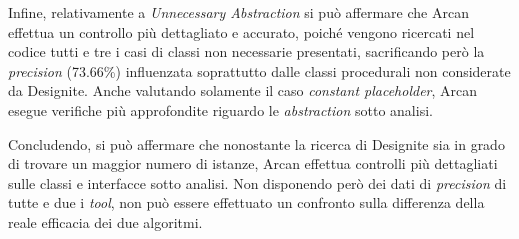 Infine, relativamente a \textit{Unnecessary Abstraction} si può affermare che Arcan effettua un controllo più dettagliato e accurato, poiché vengono ricercati nel codice tutti e tre i casi di classi non necessarie presentati, sacrificando però la \textit{precision} (73.66\%) influenzata soprattutto dalle classi procedurali non considerate da Designite. Anche valutando solamente il caso \textit{constant placeholder}, Arcan esegue verifiche più approfondite riguardo le \textit{abstraction} sotto analisi.

Concludendo, si può affermare che nonostante la ricerca di Designite sia in grado di trovare un maggior numero di istanze, Arcan effettua controlli più dettagliati sulle classi e interfacce sotto analisi. Non disponendo però dei dati di \textit{precision} di tutte e due i \textit{tool}, non può essere effettuato un confronto sulla differenza della reale efficacia dei due algoritmi.





